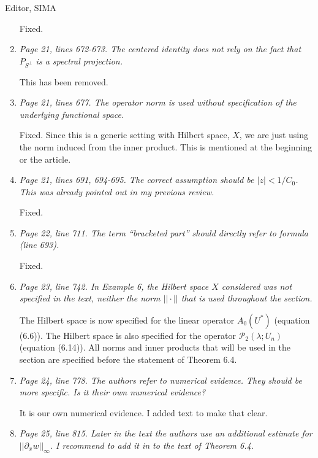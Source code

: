 \documentclass[11pt]{letter}
\begin{document}
\begin{letter}{Editor, SIMA}
\begin{enumerate}
Fixed.

\item \emph{Page 21, lines 672-673. The centered identity does not rely on the fact that $P_{S^\perp}$ is a spectral projection.}

This has been removed.

\item \emph{Page 21, lines 677. The operator norm is used without specification of the underlying functional space.}
\vspace{4mm}

Fixed. Since this is a generic setting with Hilbert space, $X$, we are just using the norm induced from the inner product.  This is mentioned at the beginning or the article.

\item \emph{Page 21, lines 691, 694-695. The correct assumption should be $|z| < 1/C_0$. This was already pointed out in my previous review.}
\vspace{4mm}

Fixed.

\item \emph{Page 22, line 711. The term ``bracketed part'' should directly refer to formula (line 693).}
\vspace{4mm}

Fixed.

\item \emph{Page 23, line 742. In Example 6, the Hilbert space $X$ considered was not specified in the text, neither the norm $||\cdot||$ that is used throughout the section.}
\vspace{4mm}

The Hilbert space is now specified for the linear operator $A_0(U^*)$ (equation (6.6)). The Hilbert space is also specified for the operator $\mathcal{P}_2(\lambda; U_n)$ (equation (6.14)). All norms and inner products that will be used in the section are specified before the statement of Theorem 6.4.

\item \emph{Page 24, line 778. The authors refer to numerical evidence. They should be more specific. Is it their own numerical evidence?}
\vspace{4mm}

It is our own numerical evidence. I added text to make that clear.

\item \emph{Page 25, line 815. Later in the text the authors use an additional estimate for $||\partial_x w||_\infty$. I recommend to add it in to the text of Theorem 6.4.}
\vspace{4mm}


\end{enumerate}
\end{letter}
\end{document}
